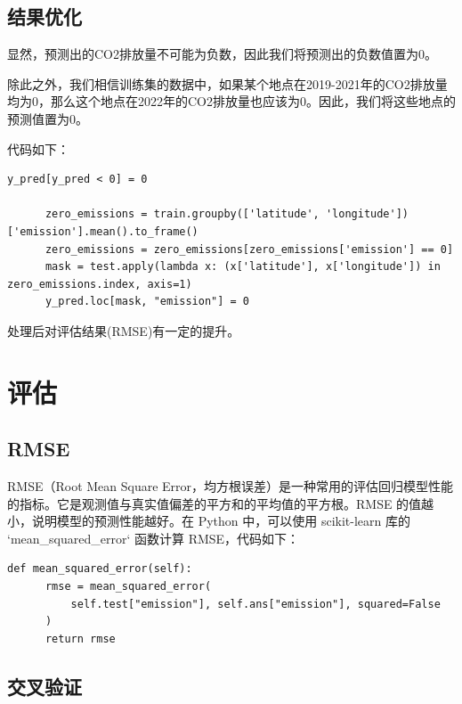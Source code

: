 \documentclass[fontset=windows]{article}
\begin{document}

\subsection{结果优化}

显然，预测出的CO2排放量不可能为负数，因此我们将预测出的负数值置为0。

除此之外，我们相信训练集的数据中，如果某个地点在2019-2021年的CO2排放量均为0，那么这个地点在2022年的CO2排放量也应该为0。因此，我们将这些地点的预测值置为0。

代码如下：

\begin{lstlisting}[style=Python]
      y_pred[y_pred < 0] = 0
      
      zero_emissions = train.groupby(['latitude', 'longitude'])['emission'].mean().to_frame()
      zero_emissions = zero_emissions[zero_emissions['emission'] == 0]
      mask = test.apply(lambda x: (x['latitude'], x['longitude']) in zero_emissions.index, axis=1)
      y_pred.loc[mask, "emission"] = 0
\end{lstlisting}

处理后对评估结果(RMSE)有一定的提升。

\section{评估}

\subsection{RMSE}

RMSE（Root Mean Square Error，均方根误差）是一种常用的评估回归模型性能的指标。它是观测值与真实值偏差的平方和的平均值的平方根。RMSE 的值越小，说明模型的预测性能越好。在 Python 中，可以使用 scikit-learn 库的 `mean\_squared\_error` 函数计算 RMSE，代码如下：

\begin{lstlisting}[style=Python]
      def mean_squared_error(self):
      rmse = mean_squared_error(
          self.test["emission"], self.ans["emission"], squared=False
      )
      return rmse
\end{lstlisting}

\subsection{交叉验证}
\end{document}

